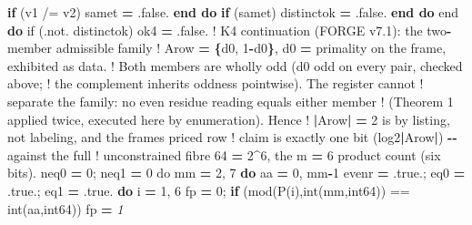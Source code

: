 \documentclass[10pt]{article}
\renewcommand{\_}{\origunderscore\allowbreak}
\newenvironment{Shaded}{}{}
\newcommand{\BuiltInTok}[1]{#1}
\newcommand{\CommentTok}[1]{\textit{#1}}
\newcommand{\ConstantTok}[1]{#1}
\newcommand{\DecValTok}[1]{#1}
\newcommand{\FloatTok}[1]{#1}
\newcommand{\FunctionTok}[1]{#1}
\newcommand{\KeywordTok}[1]{\textbf{#1}}
\newcommand{\NormalTok}[1]{#1}
\newcommand{\OperatorTok}[1]{#1}
\newcommand{\StringTok}[1]{#1}
\begin{document}
\begin{Shaded}
\begin{Highlighting}[]
              \KeywordTok{if}\NormalTok{ (v1 }\OperatorTok{/=}\NormalTok{ v2) same\_t }\KeywordTok{=} \ConstantTok{.false.}
           \KeywordTok{end do}
           \KeywordTok{if}\NormalTok{ (same\_t) distinct\_ok }\KeywordTok{=} \ConstantTok{.false.}
        \KeywordTok{end do}
\BuiltInTok{     e}\NormalTok{nd }\KeywordTok{do}
\BuiltInTok{     i}\NormalTok{f (}\OperatorTok{.not.}\NormalTok{ distinct\_ok) ok4 }\KeywordTok{=} \ConstantTok{.false.}
\BuiltInTok{     !}\NormalTok{ K4 continuation (FORGE v7}\FloatTok{.1}\NormalTok{): the two}\KeywordTok{{-}}\NormalTok{member admissible family}
\BuiltInTok{     !}\NormalTok{ A\_row }\KeywordTok{=} \KeywordTok{\{}\NormalTok{d0, }\DecValTok{1}\KeywordTok{{-}}\NormalTok{d0}\KeywordTok{\}}\NormalTok{, d0 }\KeywordTok{=}\NormalTok{ primality on the frame, exhibited as data.}
\BuiltInTok{     !}\NormalTok{ Both members are wholly odd (d0 odd on every pair, checked above;}
\BuiltInTok{     !}\NormalTok{ the complement inherits oddness pointwise). The register cannot}
\BuiltInTok{     !}\NormalTok{ separate the family: no even residue reading equals either member}
\BuiltInTok{     !}\NormalTok{ (Theorem }\DecValTok{1}\NormalTok{ applied twice, executed here by enumeration). Hence}
\BuiltInTok{     !} \KeywordTok{|}\NormalTok{A\_row}\KeywordTok{|} \KeywordTok{=} \DecValTok{2}\NormalTok{ is by listing, }\BuiltInTok{not}\NormalTok{ labeling, and the frame}\StringTok{\textquotesingle{}}\NormalTok{s priced row}
\BuiltInTok{     !}\NormalTok{ claim is exactly one bit (log2}\KeywordTok{|}\NormalTok{A\_row}\KeywordTok{|}\NormalTok{) }\KeywordTok{{-}{-}}\NormalTok{ against the full}
\BuiltInTok{     !}\NormalTok{ unconstrained fibre }\DecValTok{64} \KeywordTok{=} \DecValTok{2}\KeywordTok{\^{}}\DecValTok{6}\NormalTok{, the m }\KeywordTok{=} \DecValTok{6} \FunctionTok{product} \FunctionTok{count}\NormalTok{ (six bits).}
\BuiltInTok{     n}\NormalTok{\_eq0 }\KeywordTok{=} \DecValTok{0}\NormalTok{; n\_eq1 }\KeywordTok{=} \DecValTok{0}
\BuiltInTok{     d}\NormalTok{o mm }\KeywordTok{=} \DecValTok{2}\NormalTok{, }\DecValTok{7}
        \KeywordTok{do}\NormalTok{ aa }\KeywordTok{=} \DecValTok{0}\NormalTok{, mm}\KeywordTok{{-}}\DecValTok{1}
\NormalTok{           even\_r }\KeywordTok{=} \ConstantTok{.true.}\NormalTok{; eq0 }\KeywordTok{=} \ConstantTok{.true.}\NormalTok{; eq1 }\KeywordTok{=} \ConstantTok{.true.}
           \KeywordTok{do}\NormalTok{ i }\KeywordTok{=} \DecValTok{1}\NormalTok{, }\DecValTok{6}
\NormalTok{              fp }\KeywordTok{=} \DecValTok{0}\NormalTok{; }\KeywordTok{if}\NormalTok{ (}\BuiltInTok{mod}\NormalTok{(P(i),}\BuiltInTok{int}\NormalTok{(mm,int64)) }\OperatorTok{==} \BuiltInTok{int}\NormalTok{(aa,int64)) fp }\KeywordTok{=}\CommentTok{ 1}

\end{Highlighting}
\end{Shaded}
\end{document}
